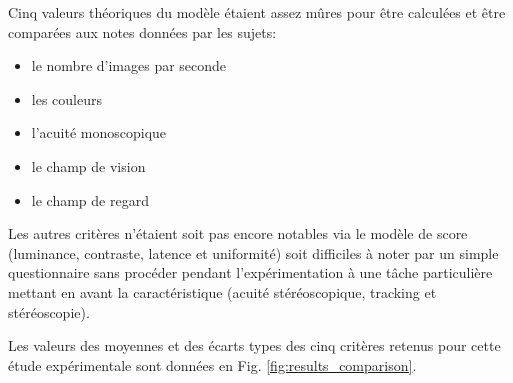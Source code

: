 	\par Cinq valeurs théoriques du modèle étaient assez mûres pour être calculées et être comparées aux notes données par les sujets:
	\begin{itemize}
		\item le nombre d'images par seconde
		\item les couleurs
		\item l'acuité monoscopique
		\item le champ de vision
		\item le champ de regard
	\end{itemize}		
	
	\par Les autres critères n'étaient soit pas encore notables via le modèle de score (luminance, contraste, latence et uniformité) soit difficiles à noter par un simple questionnaire sans procéder pendant l'expérimentation à une tâche particulière mettant en avant la caractéristique (acuité stéréoscopique, tracking et stéréoscopie).
	
	\par Les valeurs des moyennes et des écarts types des cinq critères retenus pour cette étude expérimentale sont données en Fig. \ref{fig:results_comparison}.
	
